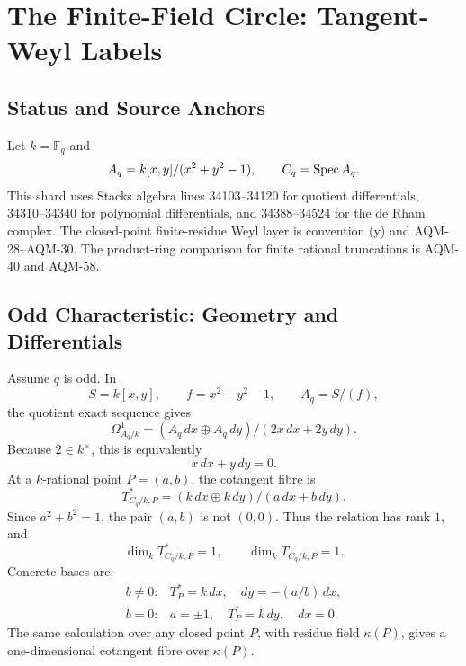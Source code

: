 \section{The Finite-Field Circle: Tangent-Weyl Labels}
\label{sec:finite-field-circle-quantum-space}
\subsection{Status and Source Anchors}
Let \(k=\mathbb F_q\) and
\[
  A_q=k[x,y]/(x^2+y^2-1),\qquad C_q=\operatorname{Spec} A_q.
\]
This shard uses Stacks algebra lines 34103--34120 for quotient differentials,
34310--34340 for polynomial differentials, and 34388--34524 for the de Rham
complex.  The closed-point finite-residue Weyl layer is convention (y) and
AQM-28--AQM-30.  The product-ring comparison for finite rational truncations
is AQM-40 and AQM-58.
\subsection{Odd Characteristic: Geometry and Differentials}
Assume \(q\) is odd.  In
\[
  S=k[x,y],\qquad f=x^2+y^2-1,\qquad A_q=S/(f),
\]
the quotient exact sequence gives
\[
  \Omega^1_{A_q/k}=
  (A_q\,dx\oplus A_q\,dy)/(2x\,dx+2y\,dy).
\]
Because \(2\in k^\times\), this is equivalently
\[
  x\,dx+y\,dy=0.
\]
At a \(k\)-rational point \(P=(a,b)\), the cotangent fibre is
\[
  T^*_{C_q/k,P}
  =
  (k\,dx\oplus k\,dy)/(a\,dx+b\,dy).
\]
Since \(a^2+b^2=1\), the pair \((a,b)\) is not \((0,0)\).  Thus the relation
has rank \(1\), and
\[
  \dim_k T^*_{C_q/k,P}=1,\qquad \dim_k T_{C_q/k,P}=1.
\]
Concrete bases are:
\[
\begin{array}{ll}
b\ne0: & T^*_{P}=k\,dx,\quad dy=-(a/b)\,dx,\\
b=0: & a=\pm1,\quad T^*_{P}=k\,dy,\quad dx=0.
\end{array}
\]
The same calculation over any closed point \(P\), with residue field
\(\kappa(P)\), gives a one-dimensional cotangent fibre over \(\kappa(P)\).
